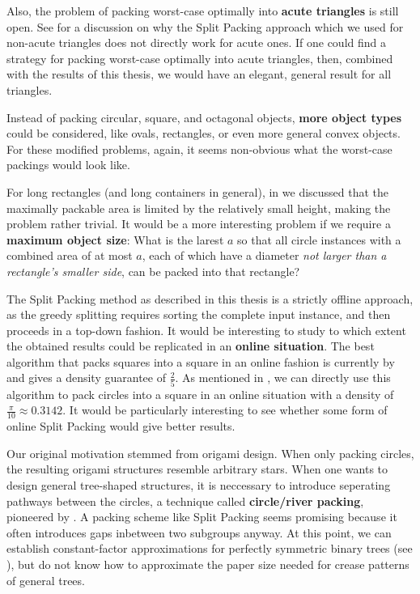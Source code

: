 \documentclass[a4paper,style=print,oneside,bibliography=totoc,nexus,lnum,extramargin]{tubsbook}
\begin{document}
Also, the problem of packing worst-case optimally into \textbf{acute triangles} is still open. See  for a discussion on why the Split Packing approach which we used for non-acute triangles does not directly work for acute ones. If one could find a strategy for packing worst-case optimally into acute triangles, then, combined with the results of this thesis, we would have an elegant, general result for all triangles.

Instead of packing circular, square, and octagonal objects, \textbf{more object types} could be considered, like ovals, rectangles, or even more general convex objects. For these modified problems, again, it seems non-obvious what the worst-case packings would look like.

For long rectangles (and long containers in general), in  we discussed that the maximally packable area is limited by the relatively small height, making the problem rather trivial. It would be a more interesting problem if we require a \textbf{maximum object size}: What is the larest $a$ so that all circle instances with a combined area of at most $a$, each of which have a diameter \emph{not larger than a rectangle's smaller side}, can be packed into that rectangle?

The Split Packing method as described in this thesis is a strictly offline approach, as the greedy splitting requires sorting the complete input instance, and then proceeds in a top-down fashion. It would be interesting to study to which extent the obtained results could be replicated in an \textbf{online situation}. The best algorithm that packs squares into a square in an online fashion is currently by \textcite{brubach2014improved} and gives a density guarantee of $\frac{2}{5}$. As mentioned in , we can directly use this algorithm to pack circles into a square in an online situation with a density of $\frac{\pi}{10} \approx 0.3142$. It would be particularly interesting to see whether some form of online Split Packing would give better results.

Our original motivation stemmed from origami design. When only packing circles, the resulting origami structures resemble arbitrary stars. When one wants to design general tree-shaped structures, it is neccessary to introduce seperating pathways between the circles, a technique called \textbf{circle/river packing}, pioneered by \textcite{lang1996computational}.
A packing scheme like Split Packing seems promising because it often introduces gaps inbetween two subgroups anyway. At this point, we can establish constant-factor approximations for perfectly symmetric binary trees (see ), but do not know how to approximate the paper size needed for crease patterns of general trees.
\end{document}

